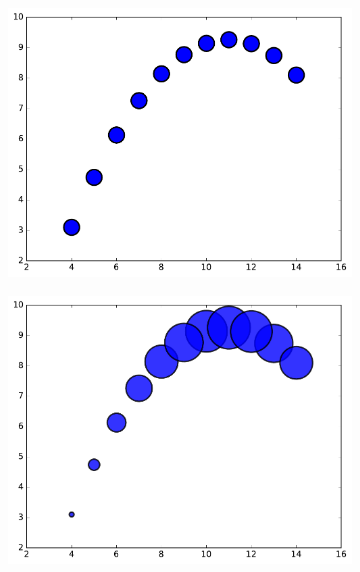 \begin{figure}[H] %
\captionsetup[subfigure]{justification=centering}
\centering
\begin{subfigure}{.49\textwidth}
    \centering
    \includegraphics[width=\linewidth]{figures/scatter_1_bad.pdf}
\end{subfigure}
%
\begin{subfigure}{.49\textwidth}
    \centering
    \includegraphics[width=\linewidth]{figures/scatter_1_good.pdf}
\end{subfigure}
\end{figure}

